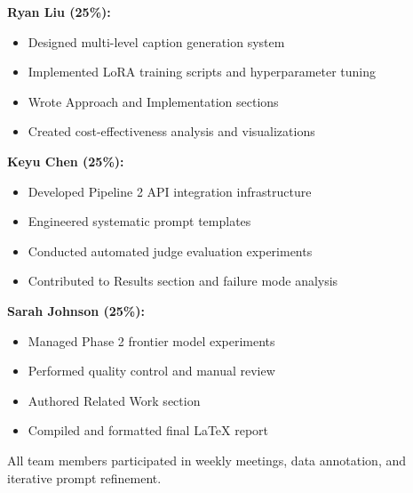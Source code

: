 \documentclass[10pt,twocolumn,letterpaper]{article}
\begin{document}
\textbf{Ryan Liu (25\%):}
\begin{itemize}
    \item Designed multi-level caption generation system
    \item Implemented LoRA training scripts and hyperparameter tuning
    \item Wrote Approach and Implementation sections
    \item Created cost-effectiveness analysis and visualizations
\end{itemize}

\textbf{Keyu Chen (25\%):}
\begin{itemize}
    \item Developed Pipeline 2 API integration infrastructure
    \item Engineered systematic prompt templates
    \item Conducted automated judge evaluation experiments
    \item Contributed to Results section and failure mode analysis
\end{itemize}

\textbf{Sarah Johnson (25\%):}
\begin{itemize}
    \item Managed Phase 2 frontier model experiments
    \item Performed quality control and manual review
    \item Authored Related Work section
    \item Compiled and formatted final LaTeX report
\end{itemize}

All team members participated in weekly meetings, data annotation, and iterative prompt refinement.
\end{document}
